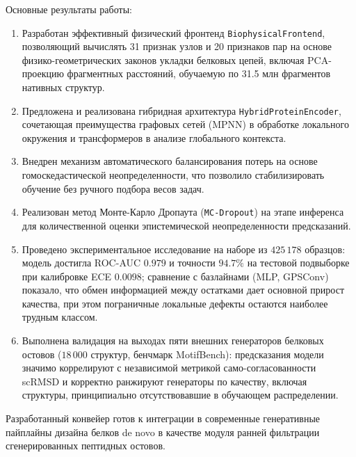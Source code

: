 \documentclass[12pt, a4paper]{article}
\begin{document}
Основные результаты работы:
\begin{enumerate}
    \item Разработан эффективный физический фронтенд \texttt{Biophysical}\allowbreak\texttt{Frontend}, позволяющий вычислять 31 признак узлов и 20 признаков пар на основе фи\-зи\-ко-ге\-о\-мет\-ри\-чес\-ких законов укладки белковых цепей, включая PCA-проекцию фрагментных расстояний, обучаемую по 31.5 млн фрагментов нативных структур.
    \item Предложена и реализована гибридная архитектура \texttt{Hybrid}\allowbreak\texttt{Protein}\allowbreak\texttt{Encoder}, сочетающая преимущества графовых сетей (MPNN) в обработке локального окружения и трансформеров в анализе глобального контекста.
    \item Внедрен механизм автоматического балансирования потерь на основе гомоскедастической неопределенности, что позволило стабилизировать обучение без ручного подбора весов задач.
    \item Реализован метод Монте-Карло Дропаута (\texttt{MC-Dropout}) на этапе инференса для количественной оценки эпистемической неопределенности предсказаний.
    \item Проведено экспериментальное исследование на наборе из $425\,178$ образцов: модель достигла ROC-AUC $0.979$ и точности $94.7\%$ на тестовой подвыборке при калибровке ECE $0.0098$; сравнение с базлайнами (MLP, GPSConv) показало, что обмен информацией между остатками дает основной прирост качества, при этом пограничные локальные дефекты остаются наиболее трудным классом.
    \item Выполнена валидация на выходах пяти внешних генераторов белковых остовов ($18\,000$ структур, бенчмарк MotifBench): предсказания модели значимо коррелируют с независимой метрикой само-согласованности scRMSD и корректно ранжируют генераторы по качеству, включая структуры, принципиально отсутствовавшие в обучающем распределении.
\end{enumerate}

Разработанный конвейер готов к интеграции в современные генеративные пайплайны дизайна белков de novo в качестве модуля ранней фильтрации сгенерированных пептидных остовов.

\newpage
\end{document}
